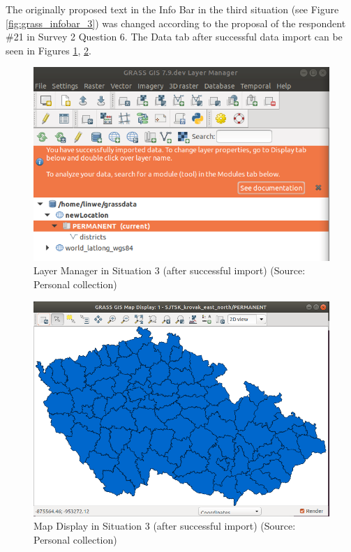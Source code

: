 \documentclass[a4paper,10pt,twoside]{article}
\begin{document}
\noindent The originally proposed text in the Info Bar in the third situation (see Figure \ref{fig:grass_infobar_3}) was changed according to the proposal of the respondent \#21 in Survey 2 Question 6. The Data tab after successful data import can be seen in Figures \ref{fig:lmgr3}, \ref{fig:mapdisplay3}.

\vspace{0.3cm}
\begin{figure}[hbt!] 
\begin{center}
\includegraphics[width=13cm]{../pictures/lmgr3.png} 
\caption[Layer Manager in Situation 3 (after successful import)]{Layer Manager in Situation 3 (after successful import) (Source: Personal collection)}
\label{fig:lmgr3}
\end{center}
\end{figure}

\newpage
\begin{figure}[hbt!] 
\begin{center}
\includegraphics[width=15cm]{../pictures/mapdisplay3.png} 
\caption[Map Display in Situation 3 (after successful import)]{Map Display in Situation 3 (after successful import) (Source: Personal collection)}
\label{fig:mapdisplay3}
\end{center}
\end{figure}
\end{document}
